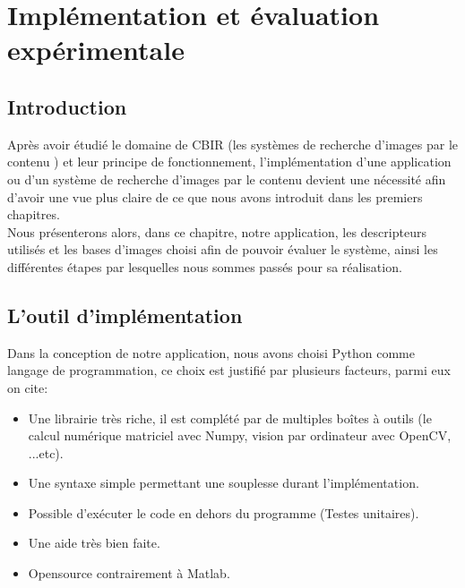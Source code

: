 
\chapter{Implémentation et évaluation expérimentale} %

\label{ChapterX} %


\section{Introduction}
Après avoir étudié le domaine de CBIR (les systèmes de recherche d’images par le contenu ) et leur principe de fonctionnement, l’implémentation d’une application ou d’un système de recherche d’images par le contenu devient une nécessité afin d’avoir une vue plus claire de ce que nous avons introduit dans les premiers chapitres. \\

Nous présenterons alors, dans ce chapitre, notre application,
les descripteurs utilisés et les bases d’images choisi afin de pouvoir évaluer le système, ainsi les différentes étapes par lesquelles nous sommes passés pour sa réalisation.

\section{L'outil d’implémentation}
Dans la conception de notre application, nous avons choisi Python
comme langage de programmation, ce choix est justifié par plusieurs
facteurs, parmi eux on cite:
\begin{itemize}
	\item Une librairie très riche, il est complété par de multiples boîtes à outils (le calcul numérique matriciel avec Numpy, vision par ordinateur avec OpenCV, ...etc).
	\item Une syntaxe simple permettant une souplesse durant l'implémentation.
	\item Possible d’exécuter le code en dehors du programme (Testes unitaires).
	\item Une aide très bien faite.
	\item Opensource contrairement à Matlab.
\end{itemize}

